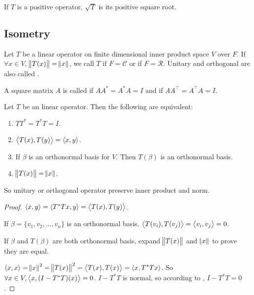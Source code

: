\begin{definition}
    If $T$ is a positive operator, $\sqrt{T}$ is its positive square root.
\end{definition}



\subsection{Isometry}

\begin{definition}
    Let $T$ be a linear operator on finite dimensional inner product space $V$ over $F$. If $\forall x \in V$, $\norm{T(x)} = \norm{x}$, we call $T$  if $F = \mathcal{C}$ or  if $F=\mathcal{R}$. Unitary and orthogonal are also called .
\end{definition}

\begin{definition}
    A square matrix $A$ is called  if $AA^* = A^*A = I$ and  if $AA^\top = A^\top A = I$.
\end{definition}

\begin{theorem}\label{unitaryproperty}
    Let $T$ be an linear operator. Then the following are equivalent:
    \begin{enumerate}
        \item $TT^* = T^* T = I$.\label{unitaryisnormal}
        \item $\left\langle \displaystyle T(x), T(y) \right\rangle = \left\langle \displaystyle x, y \right\rangle$.
        \item If $\beta$ is an orthonormal basis for $V$. Then $T(\beta)$ is an orthonormal basis.
        \item $\norm{T(x)} = \norm{x}$.
    \end{enumerate}
    
    So unitary or orthogonal operator preserve inner product and norm.
\end{theorem}
\begin{proof}
    $\left\langle \displaystyle x, y \right\rangle = \left\langle \displaystyle T^* T x, y \right\rangle = \left\langle \displaystyle T(x), T(y) \right\rangle$.
    
    If $\beta = \{v_1,v_2,\dots,v_n \}$ is an orthonormal basis. $\left\langle \displaystyle T(v_i), T(v_j) \right\rangle = \left\langle \displaystyle v_i, v_j \right\rangle = 0$.
    
    If $\beta$ and $T(\beta)$ are both orthonormal basis, expand $\norm{T(x)}$ and $\norm{x}$ to prove they are equal.
    
    $\left\langle \displaystyle x, x \right\rangle = \norm{x}^2 = \norm{T(x)}^2 = \left\langle \displaystyle T(x), T(x) \right\rangle = \left\langle \displaystyle x, T^*Tx \right\rangle$. So $\forall x \in V, \left\langle \displaystyle x, (I - T^*T)(x) \right\rangle = 0$. $I - T^*T$ is normal, so according to , $I - T^* T = 0$.
\end{proof}

